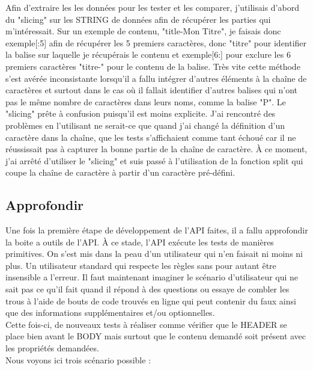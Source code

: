 Afin d'extraire les les données pour les tester et les comparer, j'utilisais d'abord du "slicing" sur les STRING de données afin de récupérer les parties qui m'intéressait. Sur un exemple de contenu, "title-Mon Titre", je faisais donc exemple[:5] afin de récupérer les 5 premiers caractères, donc "titre" pour identifier la balise sur laquelle je récupérais le contenu et exemple[6:] pour exclure les 6 premiers caractères "titre-" pour le contenu de la balise. Très vite cette méthode s'est avérée inconsistante lorsqu'il a fallu intégrer d'autres éléments à la chaîne de caractères et surtout dans le cas où il fallait identifier d'autres balises qui n'ont pas le même nombre de caractères dans leurs noms, comme la balise "P". Le "slicing" prête à confusion puisqu'il est moins explicite. J'ai rencontré des problèmes en l'utilisant ne serait-ce que quand j'ai changé la définition d'un caractère dans la chaîne, que les tests s'affichaient comme tant échoué car il ne réussissait pas à capturer la bonne partie de la chaîne de caractère. À ce moment, j'ai arrêté d'utiliser le "slicing" et suis passé à l'utilisation de la fonction split qui coupe la chaîne de caractère à partir d'un caractère pré-défini.\\

\subsection{Approfondir}

Une fois la première étape de développement de l'API faites, il a fallu approfondir la boite a outils de l'API. À ce stade, l'API exécute les tests de manières primitives. On s'est mis dans la peau d'un utilisateur qui n'en faisait ni moins ni plus. Un utilisateur standard qui respecte les règles sans pour autant être insensible a l'erreur. Il faut maintenant imaginer le scénario d'utilisateur qui ne sait pas ce qu'il fait quand il répond à des questions ou essaye de combler les trous à l'aide de bouts de code trouvés en ligne qui peut contenir du faux ainsi que des informations supplémentaires et/ou optionnelles.\\

Cette fois-ci, de nouveaux tests à réaliser comme vérifier que le HEADER se place bien avant le BODY mais surtout que le contenu demandé soit présent avec les propriétés demandées.\\

Nous voyons ici trois scénario possible :\\

